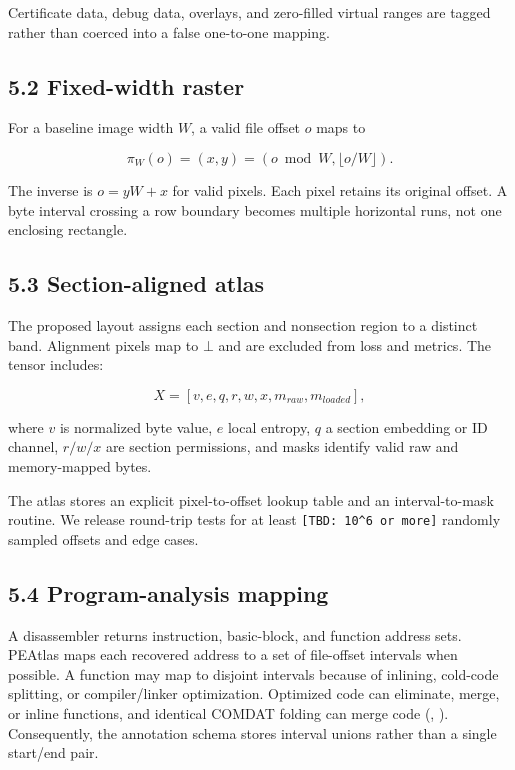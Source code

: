 \documentclass[
  10pt,
]{article}
\begin{document}
Certificate data, debug data, overlays, and zero-filled virtual ranges
are tagged rather than coerced into a false one-to-one mapping.

\subsection{5.2 Fixed-width raster}\label{fixed-width-raster}

For a baseline image width \(W\), a valid file offset \(o\) maps to

\[
\pi_W(o) = (x,y) = (o \bmod W, \lfloor o/W \rfloor).
\]

The inverse is \(o=yW+x\) for valid pixels. Each pixel retains its
original offset. A byte interval crossing a row boundary becomes
multiple horizontal runs, not one enclosing rectangle.

\subsection{5.3 Section-aligned atlas}\label{section-aligned-atlas}

The proposed layout assigns each section and nonsection region to a
distinct band. Alignment pixels map to \(\bot\) and are excluded from
loss and metrics. The tensor includes:

\[
X = [v, e, q, r, w, x, m_{raw}, m_{loaded}],
\]

where \(v\) is normalized byte value, \(e\) local entropy, \(q\) a
section embedding or ID channel, \(r/w/x\) are section permissions, and
masks identify valid raw and memory-mapped bytes.

The atlas stores an explicit pixel-to-offset lookup table and an
interval-to-mask routine. We release round-trip tests for at least
\texttt{{[}TBD:\ 10\^{}6\ or\ more{]}} randomly sampled offsets and edge
cases.

\subsection{5.4 Program-analysis
mapping}\label{program-analysis-mapping}

A disassembler returns instruction, basic-block, and function address
sets. PEAtlas maps each recovered address to a set of file-offset
intervals when possible. A function may map to disjoint intervals
because of inlining, cold-code splitting, or compiler/linker
optimization. Optimized code can eliminate, merge, or inline functions,
and identical COMDAT folding can merge code
(,
). Consequently, the annotation
schema stores interval unions rather than a single start/end pair.
\end{document}

